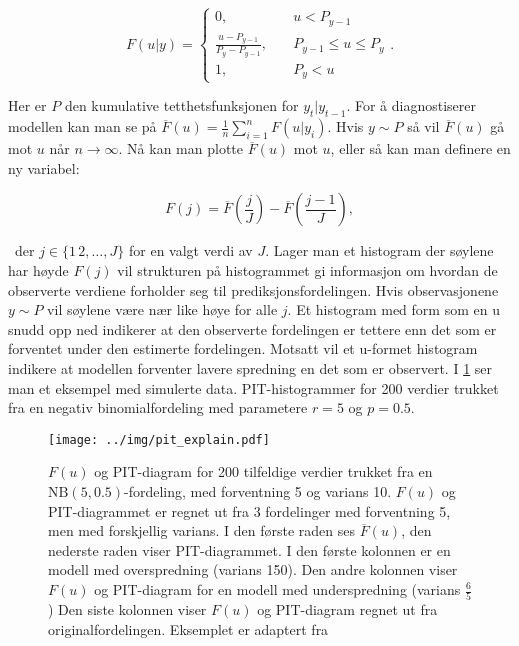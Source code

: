 $$
F(u|y) = \begin{cases}
    0, & \quad u < P_{y-1} \\
    \frac{u - P_{y-1}}{P_y - P_{y-1}}, & \quad P_{y-1} \leq u \leq P_y \\
    1, & \quad P_y < u
         \end{cases}  
.
$$

Her er $P$ den kumulative tetthetsfunksjonen for $y_t | y_{t-1}$. For å
diagnostiserer modellen kan man se på $\overline{F}(u) =
\frac{1}{n}\sum_{i=1}^nF(u|y_i)$. Hvis $y \sim P$ så vil $\overline{F}(u)$ gå
mot $u$ når $n \to \infty$. Nå kan man plotte $\overline{F}(u)$ mot $u$, eller
så kan man definere en ny variabel:

$$
F(j)= \overline{F}\left(\frac{j}{J}\right) 
- \overline{F}\left(\frac{j-1}{J}\right),
$$

\
der $j \in \{1\,2,\ldots,J \}$ for en valgt verdi av $J$. Lager man et
histogram der søylene har høyde $F(j)$ vil strukturen på histogrammet gi
informasjon om hvordan de observerte verdiene forholder seg til
prediksjonsfordelingen. Hvis observasjonene $y \sim P$ vil søylene være nær
like høye for alle $j$. Et histogram med form som en u snudd opp ned indikerer
at den observerte fordelingen er tettere enn det som er forventet under den
estimerte fordelingen. Motsatt vil et u-formet histogram indikere at modellen
forventer lavere spredning en det som er observert. I \cref{fig:pit_explain}
ser man et eksempel med simulerte data. PIT-histogrammer for 200 verdier
trukket fra en negativ binomialfordeling med parametere $r=5$ og $p=0.5$. 

    \begin{figure}[!h]
    \centering
    \texttt{[image: ../img/pit\_explain.pdf]}
    \caption{
        $F(u)$ og PIT-diagram for 200 tilfeldige verdier trukket fra en
        $\mathrm{NB}(5, 0.5)$-fordeling, med forventning 5 og varians 10.
        $F(u)$ og PIT-diagrammet er regnet ut fra 3 fordelinger med forventning
        5, men med forskjellig varians. I den første raden ses
        $\overline{F}(u)$, den nederste raden viser PIT-diagrammet. I den
        første kolonnen er en modell med overspredning (varians 150). Den andre
        kolonnen viser $F(u)$ og PIT-diagram for en modell med underspredning
        (varians $\frac{6}{5}$) Den siste kolonnen viser $F(u)$ og PIT-diagram
        regnet ut fra originalfordelingen. Eksemplet er adaptert fra
        \cite{czado2009predictive}
    }
        \label{fig:pit_explain}
    \end{figure}

